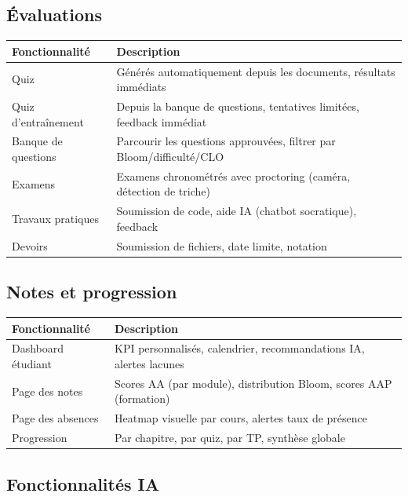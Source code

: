 \documentclass[12pt,a4paper]{article}
\begin{document}
\subsection{Évaluations}

\begin{longtable}{@{}p{4cm}p{10.5cm}@{}}
\toprule
\textbf{Fonctionnalité} & \textbf{Description} \\
\midrule
\endhead
Quiz & Générés automatiquement depuis les documents, résultats immédiats \\
Quiz d'entraînement & Depuis la banque de questions, tentatives limitées, feedback immédiat \\
Banque de questions & Parcourir les questions approuvées, filtrer par Bloom/difficulté/CLO \\
Examens & Examens chronométrés avec proctoring (caméra, détection de triche) \\
Travaux pratiques & Soumission de code, aide IA (chatbot socratique), feedback \\
Devoirs & Soumission de fichiers, date limite, notation \\
\bottomrule
\end{longtable}

\subsection{Notes et progression}

\begin{longtable}{@{}p{4cm}p{10.5cm}@{}}
\toprule
\textbf{Fonctionnalité} & \textbf{Description} \\
\midrule
\endhead
Dashboard étudiant & KPI personnalisés, calendrier, recommandations IA, alertes lacunes \\
Page des notes & Scores AA (par module), distribution Bloom, scores AAP (formation) \\
Page des absences & Heatmap visuelle par cours, alertes taux de présence \\
Progression & Par chapitre, par quiz, par TP, synthèse globale \\
\bottomrule
\end{longtable}

\subsection{Fonctionnalités IA}
\end{document}
